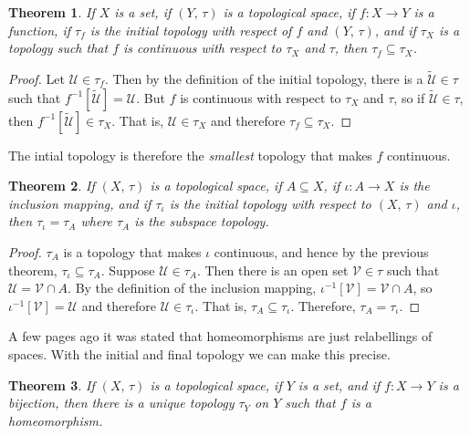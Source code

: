 \documentclass{article}
\theoremstyle{plain}
\newtheorem{theorem}{Theorem}[section]
\theoremstyle{normal}
\begin{document}
        \begin{theorem}
            If $X$ is a set, if $(Y,\,\tau)$ is a topological space, if
            $f:X\rightarrow{Y}$ is a function, if $\tau_{f}$ is the initial
            topology with respect of $f$ and $(Y,\,\tau)$, and if
            $\tau_{X}$ is a topology such that $f$ is continuous with respect
            to $\tau_{X}$ and $\tau$, then $\tau_{f}\subseteq\tau_{X}$.
        \end{theorem}
        \begin{proof}
            Let $\mathcal{U}\in\tau_{f}$. Then by the definition of the initial
            topology, there is a $\tilde{\mathcal{U}}\in\tau$ such that
            $f^{-1}[\tilde{\mathcal{U}}]=\mathcal{U}$. But $f$ is continuous
            with respect to $\tau_{X}$ and $\tau$, so if
            $\tilde{\mathcal{U}}\in\tau$, then
            $f^{-1}[\tilde{\mathcal{U}}]\in\tau_{X}$. That is,
            $\mathcal{U}\in\tau_{X}$ and therefore $\tau_{f}\subseteq\tau_{X}$.
        \end{proof}
        The intial topology is therefore the \textit{smallest} topology that
        makes $f$ continuous.
        \begin{theorem}
            If $(X,\,\tau)$ is a topological space, if $A\subseteq{X}$, if
            $\iota:A\rightarrow{X}$ is the inclusion mapping, and if
            $\tau_{\iota}$ is the initial topology with respect to
            $(X,\,\tau)$ and $\iota$, then $\tau_{\iota}=\tau_{A}$ where
            $\tau_{A}$ is the subspace topology.
        \end{theorem}
        \begin{proof}
            $\tau_{A}$ is a topology that makes $\iota$ continuous, and hence
            by the previous theorem, $\tau_{\iota}\subseteq\tau_{A}$. Suppose
            $\mathcal{U}\in\tau_{A}$. Then there is an open set
            $\mathcal{V}\in\tau$ such that
            $\mathcal{U}=\mathcal{V}\cap{A}$. By the definition of the
            inclusion mapping, $\iota^{-1}[\mathcal{V}]=\mathcal{V}\cap{A}$,
            so $\iota^{-1}[\mathcal{V}]=\mathcal{U}$ and therefore
            $\mathcal{U}\in\tau_{\iota}$. That is,
            $\tau_{A}\subseteq\tau_{\iota}$. Therefore, $\tau_{A}=\tau_{\iota}$.
        \end{proof}
        A few pages ago it was stated that homeomorphisms are just relabellings
        of spaces. With the initial and final topology we can make this
        precise.
        \begin{theorem}
            If $(X,\,\tau)$ is a topological space, if $Y$ is a set, and if
            $f:X\rightarrow{Y}$ is a bijection, then there is a unique
            topology $\tau_{Y}$ on $Y$ such that $f$ is a homeomorphism.
        \end{theorem}
\end{document}
